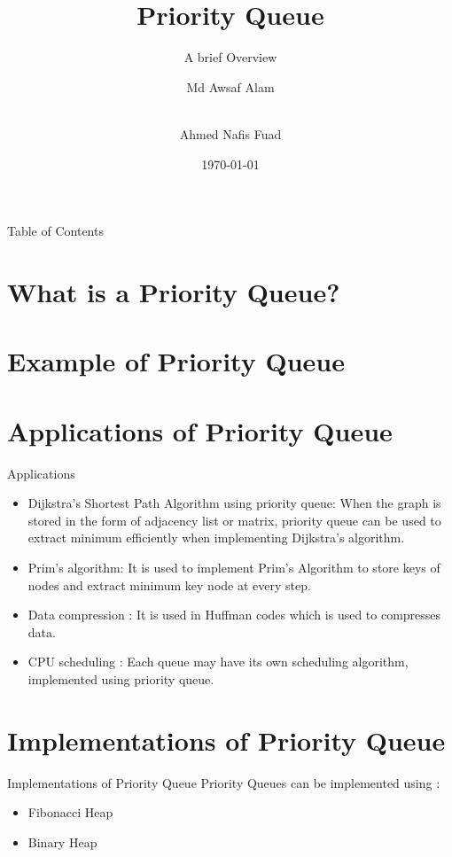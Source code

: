 \documentclass{beamer}
\title[Priority Queue]{Priority Queue}
\subtitle{A brief Overview}
\author[Awsaf, Fuad] %
{Md Awsaf Alam\inst{1} \and \\Ahmed Nafis Fuad\inst{1}}
\institute[BUET] %
{
  \inst{1}%
  Department of Computer Science and Engineering\\
  BUET
}
\date{\today}
\begin{document}
\titlepage

\begin{frame}{Table of Contents}
\tableofcontents

\end{frame}

\section{What is a Priority Queue?}



\section{Example of Priority Queue}


\section{Applications of Priority Queue}
\begin{frame}{Applications}
\begin{itemize}
  \item  Dijkstra’s Shortest Path Algorithm using priority queue: When the graph is stored in the form of adjacency list or matrix, priority queue can be used to extract minimum efficiently when implementing Dijkstra’s algorithm. \pause
  \item  Prim’s algorithm: It is used to implement Prim’s Algorithm to store keys of nodes and extract minimum key node at every step. \pause
  \item  Data compression : It is used in Huffman codes which is used to compresses data. \pause
  \item  CPU scheduling : Each queue may have its own scheduling algorithm, implemented using priority queue.
\end{itemize}

\end{frame}


\section{Implementations of Priority Queue}
\begin{frame}{Implementations of Priority Queue}
\centering
Priority Queues can be implemented using : \pause
\begin{itemize}
  \item Fibonacci Heap \pause
  \item Binary Heap \pause
\end{itemize}

\end{frame}
\end{document}
